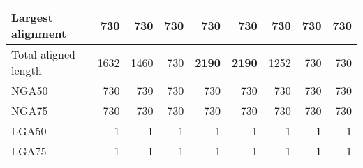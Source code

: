 \documentclass[12pt,a4paper]{article}
\begin{document}
\begin{table}[ht]
\begin{center}
\begin{tabular}{|l*{8}{|r}|}
Largest alignment & 730 & 730 & 730 & 730 & 730 & 730 & 730 & 730 \\ \hline
Total aligned length & 1632 & 1460 & 730 & {\bf 2190} & {\bf 2190} & 1252 & 730 & 730 \\ \hline
NGA50 & 730 & 730 & 730 & 730 & 730 & 730 & 730 & 730 \\ \hline
NGA75 & 730 & 730 & 730 & 730 & 730 & 730 & 730 & 730 \\ \hline
LGA50 & 1 & 1 & 1 & 1 & 1 & 1 & 1 & 1 \\ \hline
LGA75 & 1 & 1 & 1 & 1 & 1 & 1 & 1 & 1 \\ \hline
\end{tabular}
\end{center}
\end{table}
\end{document}
